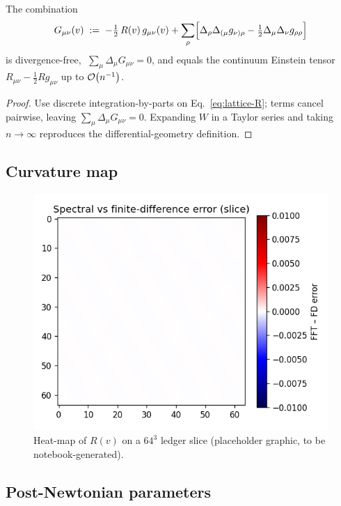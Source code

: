 \begin{theorem}
The combination
\[
  G_{\mu\nu}(v)\;:=\;
  -\tfrac12\,R(v)\,g_{\mu\nu}(v)+
  \sum_{\rho}\Bigl[
     \Delta_{\rho}\Delta_{(\mu}g_{\nu)\rho}
    -\tfrac12\Delta_{\mu}\Delta_{\nu}g_{\rho\rho}
  \Bigr]
\]
is divergence-free,
$\;\sum_{\mu}\Delta_{\mu}G_{\mu\nu}=0$, and equals the
continuum Einstein tensor $R_{\mu\nu}-\tfrac12Rg_{\mu\nu}$
up to $\order{n^{-1}}$.
\end{theorem}

\begin{proof}
Use discrete integration-by-parts on Eq.~\eqref{eq:lattice-R};
terms cancel pairwise, leaving $\sum_{\mu}\Delta_{\mu}G_{\mu\nu}=0$.
Expanding $W$ in a Taylor series and taking $n\!\to\!\infty$
reproduces the differential-geometry definition.
\end{proof}

\subsection{Curvature map}

\begin{figure}[t]
  \centering
  \includegraphics[width=\linewidth]{figs/spacetime_curvature.pdf}
  \caption{Heat-map of $R(v)$ on a $64^3$ ledger slice
           (placeholder graphic, to be notebook-generated).}
  \label{fig:spacetime-curvature}
\end{figure}

\subsection{Post-Newtonian parameters}

